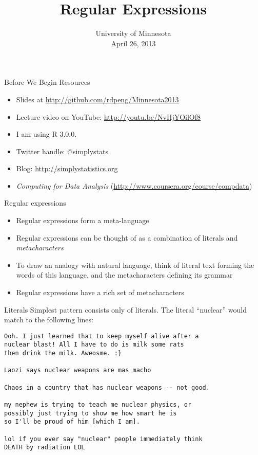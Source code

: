 \documentclass[aspectratio=169]{beamer}
\title{Regular Expressions}
\date{University of Minnesota\\April 26, 2013}
\begin{document}
\begin{frame}
  \titlepage
\end{frame}

\begin{frame}{Before We Begin}
Resources
\begin{itemize}
\item Slides at \url{http://github.com/rdpeng/Minnesota2013}
\item Lecture video on YouTube: \url{http://youtu.be/NvHjYOilOf8}
\item I am using R 3.0.0.
\item Twitter handle: @simplystats
\item Blog: \url{http://simplystatistics.org}
\item \textit{Computing for Data Analysis} (\url{http://www.coursera.org/course/compdata})
\end{itemize}
\end{frame}


\begin{frame}{Regular expressions}
\begin{itemize}
\item
Regular expressions form a meta-language
\item
Regular expressions can be thought of as a combination of literals and
\textit{metacharacters}
\item
To draw an analogy with natural language, think of literal text
forming the words of this language, and the metacharacters defining
its grammar
\item
Regular expressions have a rich set of metacharacters
\end{itemize}

\end{frame}

\begin{frame}[fragile]{Literals}
Simplest pattern consists only of literals.  The literal ``nuclear''
would match to the following lines:
\begin{verbatim}
Ooh. I just learned that to keep myself alive after a 
nuclear blast! All I have to do is milk some rats 
then drink the milk. Aweosme. :}

Laozi says nuclear weapons are mas macho

Chaos in a country that has nuclear weapons -- not good.

my nephew is trying to teach me nuclear physics, or 
possibly just trying to show me how smart he is 
so I'll be proud of him [which I am].

lol if you ever say "nuclear" people immediately think 
DEATH by radiation LOL
\end{verbatim}
\end{frame}
\end{document}
